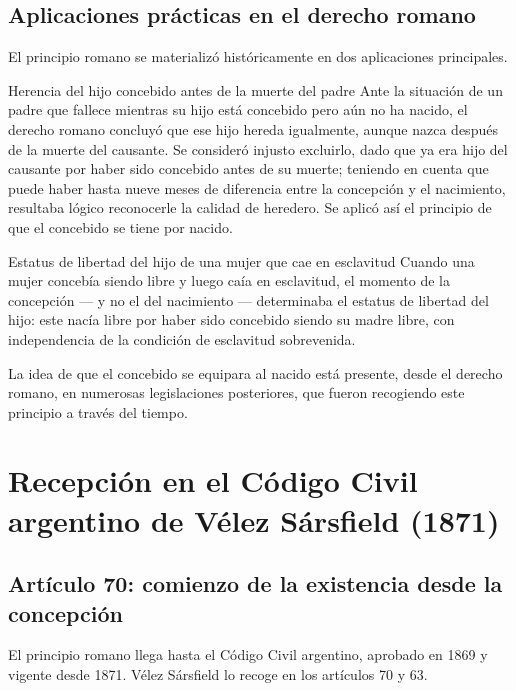 \documentclass[12pt,oneside]{book}
\begin{document}
\subsection{Aplicaciones prácticas en el derecho romano}

El principio romano se materializó históricamente en dos aplicaciones principales.

\begin{example}{Herencia del hijo concebido antes de la muerte del padre}
Ante la situación de un padre que fallece mientras su hijo está concebido pero aún no ha nacido, el derecho romano concluyó que ese hijo hereda igualmente, aunque nazca después de la muerte del causante. Se consideró injusto excluirlo, dado que ya era hijo del causante por haber sido concebido antes de su muerte; teniendo en cuenta que puede haber hasta nueve meses de diferencia entre la concepción y el nacimiento, resultaba lógico reconocerle la calidad de heredero. Se aplicó así el principio de que el concebido se tiene por nacido.
\end{example}

\begin{example}{Estatus de libertad del hijo de una mujer que cae en esclavitud}
Cuando una mujer concebía siendo libre y luego caía en esclavitud, el momento de la concepción --- y no el del nacimiento --- determinaba el estatus de libertad del hijo: este nacía libre por haber sido concebido siendo su madre libre, con independencia de la condición de esclavitud sobrevenida.
\end{example}

La idea de que el concebido se equipara al nacido está presente, desde el derecho romano, en numerosas legislaciones posteriores, que fueron recogiendo este principio a través del tiempo.

\section{Recepción en el Código Civil argentino de Vélez Sársfield (1871)}

\subsection{Artículo 70: comienzo de la existencia desde la concepción}

El principio romano llega hasta el Código Civil argentino, aprobado en 1869 y vigente desde 1871. Vélez Sársfield lo recoge en los artículos 70 y 63.
\end{document}
